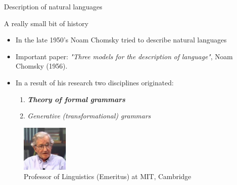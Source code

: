\documentclass{beamer}
\begin{document}
\begin{frame}{Description of natural languages}

\begin{block}{A really small bit of history}
\begin{itemize}
\item In the late 1950's Noam Chomsky tried to describe natural languages
\item Important paper:  \textit{"Three models for the description of language"}, Noam Chomsky (1956).
\item In a result of his research two disciplines originated:
\begin{enumerate}
\item \textbf{\textit{Theory of formal grammars}}
\item \textit{Generative (transformational) grammars}
\end{enumerate}
\end{itemize}
\end{block}

\begin{figure}
\includegraphics[width=0.2\textwidth]{img/noam_2.jpg}
\caption{\label{fig:your-figure}Professor of Linguistics (Emeritus) at MIT, Cambridge}
\end{figure}

\end{frame}

\end{document}

